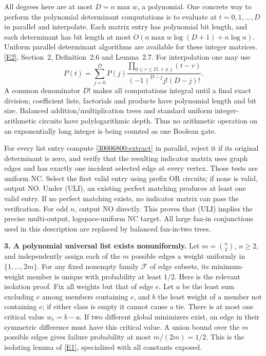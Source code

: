 \documentclass[11pt,a4paper]{article}
\newcommand{\eref}[2]{\hyperlink{extra:#1:#2}{[E#2]}}
\numberwithin{equation}{section}
\begin{document}
All degrees here are at most $D=n\max w$, a polynomial. One concrete
way to perform the polynomial determinant computations is to evaluate
at $t=0,1,\ldots,D$ in parallel and interpolate. Each matrix entry has
polynomial bit length, and each determinant has bit length at most
$O(n\max w\log(D+1)+n\log n)$. Uniform parallel determinant algorithms
are available for these integer matrices. \eref{30006800}{2}, Section~2,
Definition~2.6 and Lemma~2.7. For interpolation one may use
\[
 P(t)=\sum_{j=0}^{D}P(j)
       \frac{\prod_{0\le r\le D,\ r\ne j}(t-r)}
            {(-1)^{D-j}j!(D-j)!}.
\]
A common denominator $D!$ makes all computations integral until a final
exact division; coefficient lists, factorials and products have
polynomial length and bit size. Balanced addition/multiplication trees
and standard uniform integer-arithmetic circuits have polylogarithmic
depth. Thus no arithmetic operation on an exponentially long integer is
being counted as one Boolean gate.

For every list entry compute \eqref{30006800:extract} in parallel, reject it
if its original determinant is zero, and verify that the resulting
indicator matrix uses graph edges and has exactly one incident selected
edge at every vertex. Those tests are uniform NC. Select the first
valid entry using prefix OR circuits; if none is valid, output NO.
Under (ULI), an existing perfect matching produces at least one valid
entry. If no perfect matching exists, no indicator matrix can pass the
verification. For odd $n$, output NO directly. This proves that (ULI)
implies the precise multi-output, logspace-uniform NC target. All
large fan-in conjunctions used in this description are replaced by
balanced fan-in-two trees.

\textbf{3. A polynomial universal list exists nonuniformly.}
Let $m=\binom n2$, $n\ge2$, and independently assign each of the $m$
possible edges a weight uniformly in $\{1,\ldots,2m\}$.
For any fixed nonempty family $\mathcal F$ of edge subsets, its
minimum-weight member is unique with probability at least $1/2$.
Here is the relevant isolation proof. Fix all weights but that of edge
$e$. Let $a$ be the least sum excluding $e$ among members containing
$e$, and $b$ the least weight of a member not containing $e$; if either
class is empty it cannot cause a tie. There is at most one critical
value $w_e=b-a$. If two different global minimizers exist, an edge in
their symmetric difference must have this critical value. A union bound
over the $m$ possible edges gives failure probability at most
$m/(2m)=1/2$. This is the isolating lemma of \eref{30006800}{1}, specialized
with all constants exposed.
\end{document}
